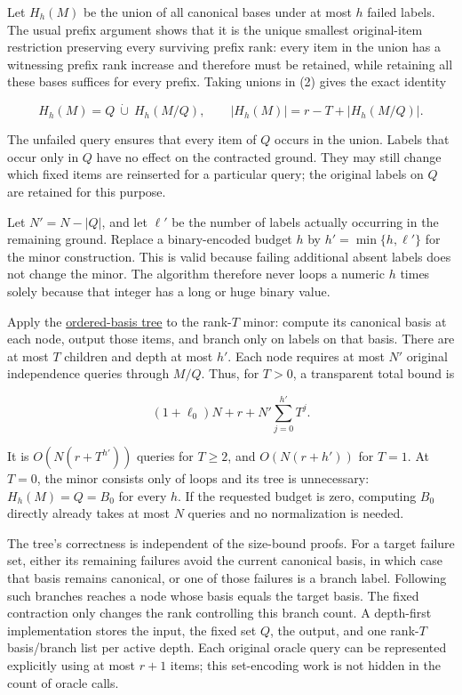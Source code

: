 Let \(H_h(M)\) be the union of all canonical bases under at most \(h\) failed labels. The usual prefix argument shows that it is the unique smallest original-item restriction preserving every surviving prefix rank: every item in the union has a witnessing prefix rank increase and therefore must be retained, while retaining all these bases suffices for every prefix. Taking unions in (2) gives the exact identity

\[
H_h(M)=Q\ \dot\cup\ H_h(M/Q),
\qquad
|H_h(M)|=r-T+|H_h(M/Q)|.
\tag{7}
\]

The unfailed query ensures that every item of \(Q\) occurs in the union. Labels that occur only in \(Q\) have no effect on the contracted ground. They may still change which fixed items are reinserted for a particular query; the original labels on \(Q\) are retained for this purpose.

Let \(N'=N-|Q|\), and let \(\ell'\) be the number of labels actually occurring in the remaining ground. Replace a binary-encoded budget \(h\) by \(h'=\min\{h,\ell'\}\) for the minor construction. This is valid because failing additional absent labels does not change the minor. The algorithm therefore never loops a numeric \(h\) times solely because that integer has a long or huge binary value.

Apply the \href{https://github.com/icekylinx/algorithm-frontier/blob/main/problems/matroid-failure-summaries/manuscripts/weighted-oracle-prefix-fpt-construction.md}{ordered-basis tree} to the rank-\(T\) minor: compute its canonical basis at each node, output those items, and branch only on labels on that basis. There are at most \(T\) children and depth at most \(h'\). Each node requires at most \(N'\) original independence queries through \(M/Q\). Thus, for \(T>0\), a transparent total bound is

\[
(1+\ell_0)N+r+
N'\sum_{j=0}^{h'}T^j.
\tag{8}
\]

It is \(O(N(r+T^{h'}))\) queries for \(T\ge2\), and \(O(N(r+h'))\) for \(T=1\). At \(T=0\), the minor consists only of loops and its tree is unnecessary: \(H_h(M)=Q=B_0\) for every \(h\). If the requested budget is zero, computing \(B_0\) directly already takes at most \(N\) queries and no normalization is needed.

The tree's correctness is independent of the size-bound proofs. For a target failure set, either its remaining failures avoid the current canonical basis, in which case that basis remains canonical, or one of those failures is a branch label. Following such branches reaches a node whose basis equals the target basis. The fixed contraction only changes the rank controlling this branch count. A depth-first implementation stores the input, the fixed set \(Q\), the output, and one rank-\(T\) basis/branch list per active depth. Each original oracle query can be represented explicitly using at most \(r+1\) items; this set-encoding work is not hidden in the count of oracle calls.

